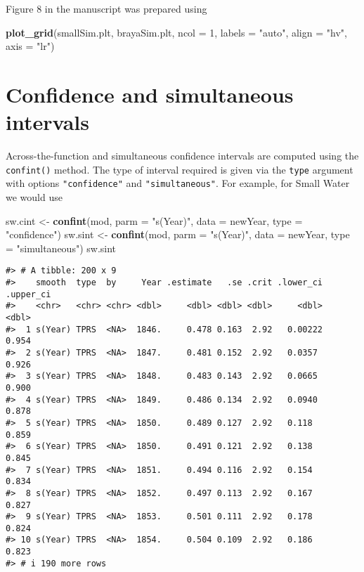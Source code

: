 \documentclass[12pt,]{article}
\newenvironment{Shaded}{\begin{snugshade}}{\end{snugshade}}
\newcommand{\DataTypeTok}[1]{\textcolor[rgb]{0.13,0.29,0.53}{#1}}
\newcommand{\DecValTok}[1]{\textcolor[rgb]{0.00,0.00,0.81}{#1}}
\newcommand{\KeywordTok}[1]{\textcolor[rgb]{0.13,0.29,0.53}{\textbf{#1}}}
\newcommand{\NormalTok}[1]{#1}
\newcommand{\StringTok}[1]{\textcolor[rgb]{0.31,0.60,0.02}{#1}}
\begin{document}
Figure 8 in the manuscript was prepared using

\begin{Shaded}
\begin{Highlighting}[]
\KeywordTok{plot_grid}\NormalTok{(smallSim.plt, brayaSim.plt, }\DataTypeTok{ncol =} \DecValTok{1}\NormalTok{, }\DataTypeTok{labels =} \StringTok{"auto"}\NormalTok{,}
          \DataTypeTok{align =} \StringTok{"hv"}\NormalTok{, }\DataTypeTok{axis =} \StringTok{"lr"}\NormalTok{)}
\end{Highlighting}
\end{Shaded}

\hypertarget{confidence-and-simultaneous-intervals}{%
\section{Confidence and simultaneous
intervals}\label{confidence-and-simultaneous-intervals}}

Across-the-function and simultaneous confidence intervals are computed
using the \texttt{confint()} method. The type of interval required is
given via the \texttt{type} argument with options \texttt{"confidence"}
and \texttt{"simultaneous"}. For example, for Small Water we would use

\begin{Shaded}
\begin{Highlighting}[]
\NormalTok{sw.cint <-}\StringTok{ }\KeywordTok{confint}\NormalTok{(mod, }\DataTypeTok{parm =} \StringTok{"s(Year)"}\NormalTok{, }\DataTypeTok{data =}\NormalTok{ newYear, }\DataTypeTok{type =} \StringTok{"confidence"}\NormalTok{)}
\NormalTok{sw.sint <-}\StringTok{ }\KeywordTok{confint}\NormalTok{(mod, }\DataTypeTok{parm =} \StringTok{"s(Year)"}\NormalTok{, }\DataTypeTok{data =}\NormalTok{ newYear, }\DataTypeTok{type =} \StringTok{"simultaneous"}\NormalTok{)}
\NormalTok{sw.sint}
\end{Highlighting}
\end{Shaded}

\begin{verbatim}
#> # A tibble: 200 x 9
#>    smooth  type  by     Year .estimate   .se .crit .lower_ci .upper_ci
#>    <chr>   <chr> <chr> <dbl>     <dbl> <dbl> <dbl>     <dbl>     <dbl>
#>  1 s(Year) TPRS  <NA>  1846.     0.478 0.163  2.92   0.00222     0.954
#>  2 s(Year) TPRS  <NA>  1847.     0.481 0.152  2.92   0.0357      0.926
#>  3 s(Year) TPRS  <NA>  1848.     0.483 0.143  2.92   0.0665      0.900
#>  4 s(Year) TPRS  <NA>  1849.     0.486 0.134  2.92   0.0940      0.878
#>  5 s(Year) TPRS  <NA>  1850.     0.489 0.127  2.92   0.118       0.859
#>  6 s(Year) TPRS  <NA>  1850.     0.491 0.121  2.92   0.138       0.845
#>  7 s(Year) TPRS  <NA>  1851.     0.494 0.116  2.92   0.154       0.834
#>  8 s(Year) TPRS  <NA>  1852.     0.497 0.113  2.92   0.167       0.827
#>  9 s(Year) TPRS  <NA>  1853.     0.501 0.111  2.92   0.178       0.824
#> 10 s(Year) TPRS  <NA>  1854.     0.504 0.109  2.92   0.186       0.823
#> # i 190 more rows
\end{verbatim}
\end{document}

